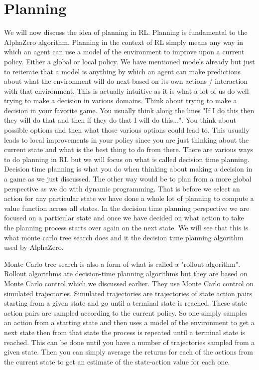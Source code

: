 
\section{Planning}

We will now discuss the idea of planning in RL. Planning is fundamental to the AlphaZero algorithm. Planning in the context of RL simply means any way in which an agent can use a model of the environment to improve upon a current policy. Either a global or local policy. We have mentioned models already but just to reiterate that a model is anything by which an agent can make predictions about what the environment will do next based on its own actions / interaction with that environment. This is actually intuitive as it is what a lot of us do well trying to make a decision in various domains. Think about trying to make a decision in your favorite game. You usually think along the lines "If I do this then they will do that and then if they do that I will do this...". You think about possible options and then what those various options could lead to. This usually leads to local improvements in your policy since you are just thinking about the current state and what is the best thing to do from there. There are various ways to do planning in RL but we will focus on what is called decision time planning. Decision time planning is what you do when thinking about making a decision in a game as we just discussed. The other way would be to plan from a more global perspective as we do with dynamic programming. That is before we select an action for any particular state we have done a whole lot of planning to compute a value function across all states. In the decision time planning perspective we are focused on a particular state and once we have decided on what action to take the planning process starts over again on the next state. We will see that this is what monte carlo tree search does and it the decision time planning algorithm used by AlphaZero.

Monte Carlo tree search is also a form of what is called a "rollout algorithm". Rollout algorithms are decision-time planning algorithms but they are based on Monte Carlo control which we discussed earlier. They use Monte Carlo control on simulated trajectories. Simulated trajectories are trajectories of state action pairs starting from a given state and go until a terminal state is reached. These state action pairs are sampled according to the current policy. So one simply samples an action from a starting state and then uses a model of the environment to get a next state then from that state the process is repeated until a terminal state is reached. This can be done until you have a number of trajectories sampled from a given state. Then you can simply average the returns for each of the actions from the current state to get an estimate of the state-action value for each one. 

